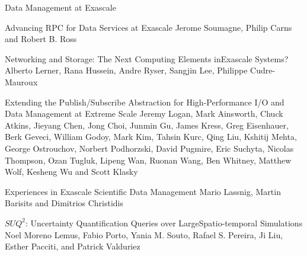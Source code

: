 \documentclass[11pt]{article}
\begin{document}
\begin{bulletin}
\begin{articlesection}{Data Management at Exascale}
%
%
\begin{article}
{Advancing RPC for Data Services at Exascale}
{Jerome Soumagne, Philip Carns and Robert B. Ross}
\graphicspath{{submissions/jerome/}}

\end{article}

\begin{article}
{Networking and Storage: The Next Computing Elements inExascale Systems?}
{Alberto Lerner, Rana Hussein, Andre Ryser, Sangjin Lee, Philippe Cudre-Mauroux}
\graphicspath{{submissions/alberto/figs/}}

\end{article}

\begin{article}
{Extending the Publish/Subscribe Abstraction for High-Performance I/O and Data Management at Extreme Scale}
{Jeremy Logan, Mark Ainsworth, Chuck Atkins, Jieyang Chen, Jong Choi, Junmin Gu, James Kress, Greg Eisenhauer, Berk Geveci, William Godoy, Mark Kim, Tahsin Kurc, Qing Liu, Kshitij Mehta, George Ostrouchov, Norbert Podhorzski, David Pugmire, Eric Suchyta, Nicolas Thompson, Ozan Tugluk, Lipeng Wan, Ruonan Wang, Ben Whitney, Matthew Wolf, Kesheng Wu and Scott Klasky}
\graphicspath{{submissions/jeremy/}}

\end{article}

\begin{article}
{Experiences in Exascale Scientific Data Management}
{Mario Lassnig, Martin Barisits and Dimitrios Christidis}
\graphicspath{{submissions/mario/}}

\end{article}

\begin{article}
{$SUQ^{2}$: Uncertainty Quantification Queries over LargeSpatio-temporal Simulations}
{Noel Moreno Lemus, Fabio Porto, Yania M. Souto, Rafael S. Pereira, Ji Liu, Esther Pacciti, and Patrick Valduriez}
\graphicspath{{submissions/fabio/}}

\end{article}

\end{articlesection}


\end{bulletin}
\end{document}
